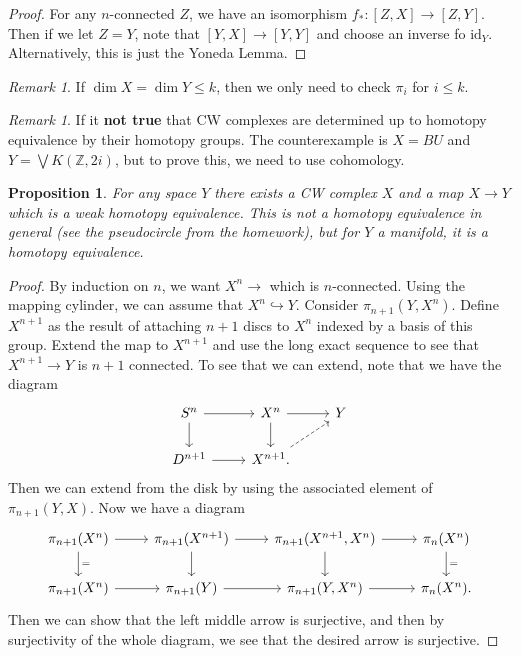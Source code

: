 \documentclass[leqno, openany]{memoir}
\newtheorem{prop}[thm]{Proposition}
\theoremstyle{definition}
\theoremstyle{remark}
\newtheorem{rmk}[thm]{Remark}
\theoremstyle{plain}
\theoremstyle{definition}
\theoremstyle{remark}
\newcommand{\Z}{\mathbb{Z}}
\newcommand{\mr}[1]{\mathrm{#1}}
\begin{document}
\begin{proof}
    For any $n$-connected $Z$, we have an isomorphism $f_* \colon [Z,X] \to [Z,Y]$. Then if we let $Z = Y$, note that $[Y,X] \to [Y,Y]$ and choose an inverse fo $\mr{id}_Y$. Alternatively, this is just the Yoneda Lemma.
\end{proof}

\begin{rmk}
    If $\dim X = \dim Y \leq k$, then we only need to check $\pi_i$ for $i \leq k$.
\end{rmk}

\begin{rmk}
    If it \textbf{not true} that CW complexes are determined up to homotopy equivalence by their homotopy groups. The counterexample is $X = BU$ and $Y = \bigvee K(\Z, 2i)$, but to prove this, we need to use cohomology. 
\end{rmk}

\begin{prop}
    For any space $Y$ there exists a CW complex $X$ and a map $X \to Y$ which is a weak homotopy equivalence. This is not a homotopy equivalence in general (see the pseudocircle from the homework), but for $Y$ a manifold, it is a homotopy equivalence.
\end{prop}

\begin{proof}
    By induction on $n$, we want $X^n \to $ which is $n$-connected. Using the mapping cylinder, we can assume that $X^n \hookrightarrow Y$. Consider $\pi_{n+1}(Y, X^n)$. Define $X^{n+1}$ as the result of attaching $n+1$ discs to $X^n$ indexed by a basis of this group. Extend the map to $X^{n+1}$ and use the long exact sequence to see that $X^{n+1} \to Y$ is $n+1$ connected. To see that we can extend, note that we have the diagram
    \begin{equation*}
    \begin{tikzcd}
        S^n \arrow{r} \arrow{d} & X^n \arrow{r} \arrow{d} & Y \\
        D^{n+1} \arrow{r} & X^{n+1}. \arrow[dashrightarrow]{ur}
    \end{tikzcd}
    \end{equation*}
    Then we can extend from the disk by using the associated element of $\pi_{n+1}(Y,X)$. Now we have a diagram
    \begin{equation*}
    \begin{tikzcd}
        \pi_{n+1}(X^n) \arrow{r} \arrow{d}{=} & \pi_{n+1}(X^{n+1}) \arrow{d} \arrow{r} & \pi_{n+1}(X^{n+1},X^n) \arrow{r} \arrow{d} & \pi_n(X^n) \arrow{d}{=} \\
        \pi_{n+1}(X^n) \arrow{r} & \pi_{n+1}(Y) \arrow{r} & \pi_{n+1}(Y, X^n) \arrow{r} & \pi_n(X^n).
    \end{tikzcd}
    \end{equation*}
    Then we can show that the left middle arrow is surjective, and then by surjectivity of the whole diagram, we see that the desired arrow is surjective.
\end{proof}
\end{document}

